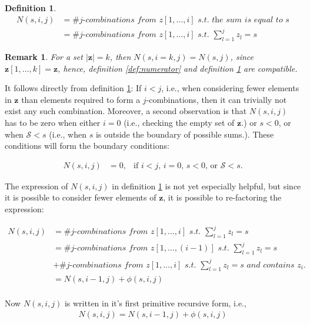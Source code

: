 \documentclass[a4paper,11pt]{article}
\newtheorem{mydef}{Definition}
\newtheorem{myremark}{Remark}
\begin{document}
\begin{mydef}
\label{def:specificNumerator}
\begin{align*}
N(s,i,j)&=\textit{\# j-combinations from $z[1,\ldots,i]$ s.t. the sum is equal to $s$}\\
        &=\textit{\# j-combinations from $z[1,\ldots,i]$ s.t. $\sum _{l=1}^{j}z_{l}=s$}
\end{align*}
\end{mydef}
\begin{myremark}
\label{rm:finalN}
For a set $|\bm{z}|=k$, then $N(s,i=k,j)=N(s,j)$, since $\bm{z}[1,\ldots,k]=\bm{z}$, hence, definition \ref{def:numerator} and definition \ref{def:specificNumerator} are compatible.
\end{myremark}

It follows directly from definition \ref{def:specificNumerator}: If $i<j$, i.e., when considering fewer elements in $\bm{z}$ than elements required to form a $j$-combinations, then it can trivially not exist any such combination. Moreover, a second observation is that $N(s,i,j)$ has to be zero when either $i=0$ (i.e., checking the empty set of $\bm{z}$.) or $s < 0$, or when $\mathcal{S} < s$ (i.e., when $s$ is outside the boundary of possible sums.). These conditions will form the boundary conditions:

\begin{align}
\label{eq:Subrecursion1}
N(s,i,j) &=0, & \text{if $i < j$, $i=0$, $s < 0$, or $\mathcal{S} < s$.}
\end{align}

The expression of $N(s,i,j)$ in definition \ref{def:specificNumerator} is not yet especially helpful, but since it is possible to consider fewer elements of $\bm{z}$, it is possible to re-factoring the expression:

\begin{align*}
N(s,i,j) &= \textit{\# $j$-combinations from $z[1,\ldots,i]$ s.t. $\sum _{l=1}^{j}z_{l}=s$} \\
        &= \textit{\# $j$-combinations from $z[1,\ldots,(i-1)]$ s.t. $\sum _{l=1}^{j}z_{l}=s$} \\
        &+ \textit{\# $j$-combinations from $z[1,\ldots,i]$ s.t. $\sum _{l=1}^{j}z_{l}=s$ and contains $z_{i}$.} \\
        &= N(s,i-1,j)+ \phi (s,i,j) \\
\end{align*}

Now $N(s,i,j)$ is written in it's first primitive recursive form, i.e.,
\begin{align}
\label{eq:recursion1}
N(s,i,j) = N(s,i-1,j)+ \phi (s,i,j)
\end{align}
\end{document}
